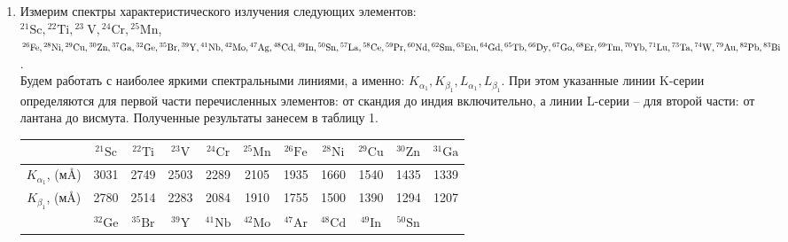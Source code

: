 \documentclass[a4paper, 12pt]{article}%
\begin{document}
	\begin{enumerate}
		
		\item Измерим спектры характеристического излучения следующих элементов: \\
		 ${ }^{21} \mathrm{Sc},{ }^{22} \mathrm{Ti},{ }^{23} \mathrm{~V},{ }^{24} \mathrm{Cr},{ }^{25} \mathrm{Mn}$, ${ }^{26} \mathrm{Fe},{ }^{28} \mathrm{Ni},{ }^{29} \mathrm{Cu}, { }^{30} \mathrm{Zn},{ }^{37} \mathrm{Ga},{ }^{32} \mathrm{Ge},{ }^{35} \mathrm{Br},{ }^{39} \mathrm{Y},{ }^{41} \mathrm{Nb},{ }^{42} \mathrm{Mo}, \\{ }^{47} \mathrm{Ag},{ }^{48} \mathrm{Cd},{ }^{49} \mathrm{In},{ }^{50} \mathrm{Sn},{ }^{57} \mathrm{La},{ }^{58} \mathrm{Ce},{ }^{59} \mathrm{Pr},{ }^{60} \mathrm{Nd},{ }^{62} \mathrm{Sm},{ }^{63} \mathrm{Eu},{ }^{64} \mathrm{Gd}, { }^{65} \mathrm{Tb},{ }^{66} \mathrm{Dy},{ }^{67} \mathrm{Go},{ }^{68} \mathrm{Er},\\{ }^{69} \mathrm{Tm},{ }^{70} \mathrm{Yb},{ }^{71} \mathrm{Lu},{ }^{73} \mathrm{Ta},{ }^{74} \mathrm{W},{ }^{79} \mathrm{Au},{ }^{82} \mathrm{Pb},{ }^{83} \mathrm{Bi}$ .\\
		 
		 
		 Будем работать с наиболее яркими спектральными линиями,
		 а именно: $K_{\alpha_1}, K_{\beta_1}, L_{\alpha_1}, L_{\beta_1}$. При этом указанные линии K-серии определяются для первой части перечисленных элементов: от скандия до индия включительно, а линии L-серии – для второй
		 части: от лантана до висмута.
		 Полученные результаты занесем в таблицу 1.
		 
		 
		 	\begin{longtable}{|c|c|c|c|c|c|c|c|c|c|c|}
		 		\hline
		 		& ${ }^{21} \mathrm{Sc}$ & ${ }^{22} \mathrm{Ti}$ & ${}^{23} \mathrm{V}$ & ${ }^{24} \mathrm{Cr}$ & ${ }^{25} \mathrm{Mn}$ & ${ }^{26} \mathrm{Fe}$ & ${ }^{28} \mathrm{Ni}$ & ${ }^{29} \mathrm{Cu}$ & ${ }^{30} \mathrm{Zn}$ & ${ }^{31} \mathrm{Ga}$ \\ \hline
		 		
		 		$K_{\alpha_1}$, (м\AA) & 3031 & 2749 & 2503 & 2289 & 2105 & 1935 & 1660 & 1540 & 1435 & 1339 \\ \hline
		 		$K_{\beta_1}$, (м\AA) & 2780 & 2514 & 2283 & 2084 & 1910 & 1755 & 1500 & 1390 & 1294 & 1207 \\ \hline
		 		\hline
		 		& ${ }^{32} \mathrm{Ge}$ & ${}^{35} \mathrm{Br}$ & ${ }^{39} \mathrm{Y}$ & ${ }^{41} \mathrm{Nb}$ & ${ }^{42} \mathrm{Mo}$ & ${ }^{47} \mathrm{Ar}$ & ${ }^{48} \mathrm{Cd}$ & ${ }^{49} \mathrm{In}$ & ${ }^{50} \mathrm{Sn}$ & \\ \hline
		 		

\end{longtable}
\end{enumerate}
\end{document}

